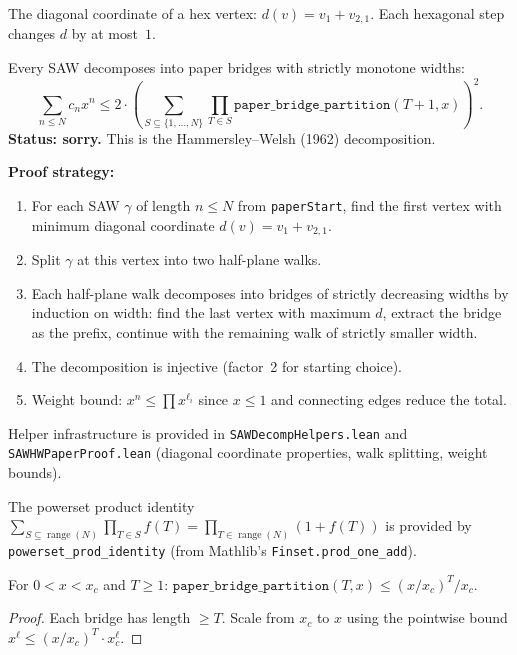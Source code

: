 \begin{definition}\label{def:diagCoord}
\leanok
{}
  The diagonal coordinate of a hex vertex: $d(v) = v_1 + v_{2,1}$.
  Each hexagonal step changes $d$ by at most~$1$.
\end{definition}

\begin{theorem}\label{thm:paper_bridge_decomp}
  Every SAW decomposes into paper bridges with strictly monotone widths:
  \[ \sum_{n \leq N} c_n x^n \leq 2 \cdot
     \left(\sum_{S \subseteq \{1,\ldots,N\}} \prod_{T \in S}
     \texttt{paper\_bridge\_partition}(T{+}1, x)\right)^2. \]
  \textbf{Status: sorry.} This is the Hammersley--Welsh (1962) decomposition.

  \textbf{Proof strategy:}
  \begin{enumerate}
  \item For each SAW $\gamma$ of length $n \leq N$ from \texttt{paperStart},
    find the first vertex with minimum diagonal coordinate $d(v) = v_1 + v_{2,1}$.
  \item Split $\gamma$ at this vertex into two half-plane walks.
  \item Each half-plane walk decomposes into bridges of strictly decreasing widths
    by induction on width: find the last vertex with maximum $d$, extract the bridge
    as the prefix, continue with the remaining walk of strictly smaller width.
  \item The decomposition is injective (factor~2 for starting choice).
  \item Weight bound: $x^n \leq \prod x^{\ell_i}$ since $x \leq 1$
    and connecting edges reduce the total.
  \end{enumerate}
  Helper infrastructure is provided in \texttt{SAWDecompHelpers.lean}
  and \texttt{SAWHWPaperProof.lean}
  (diagonal coordinate properties, walk splitting, weight bounds).

  The powerset product identity
  $\sum_{S \subseteq \operatorname{range}(N)} \prod_{T \in S} f(T)
  = \prod_{T \in \operatorname{range}(N)} (1 + f(T))$
  is provided by \texttt{powerset\_prod\_identity}
  (from Mathlib's \texttt{Finset.prod\_one\_add}).
\end{theorem}

\begin{theorem}\label{thm:paper_bridge_decay_thm}
\leanok
{}
  For $0 < x < x_c$ and $T \geq 1$:
  $\texttt{paper\_bridge\_partition}(T, x) \leq (x/x_c)^T / x_c$.
\end{theorem}
\begin{proof}
\leanok
{}
  Each bridge has length $\geq T$. Scale from $x_c$ to $x$
  using the pointwise bound $x^{\ell} \leq (x/x_c)^T \cdot x_c^{\ell}$.
\end{proof}

